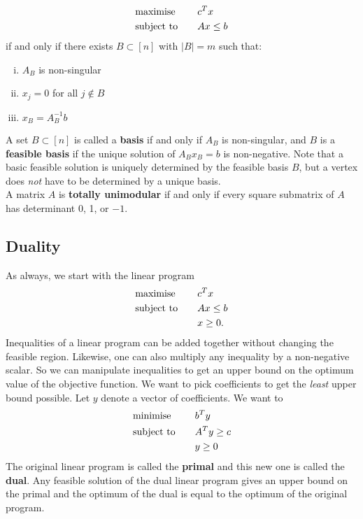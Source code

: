 \documentclass[12pt]{article}
\theoremstyle{plain}
\begin{document}
\begin{alignat*}{2}
    & \textup{maximise} & \quad & c^Tx \\
    & \textup{subject to} & & Ax \leq b
\end{alignat*}
if and only if there exists $B\subset [n]$ with $|B|= m$ such that:
\begin{enumerate}[i)]
    \item $A_B$ is non-singular
    \item $x_j = 0$ for all $j\notin B$
    \item $x_B = A_B^{-1}b$
\end{enumerate}
A set $B\subset [n]$ is called a \textbf{basis} if and only if $A_B$ is non-singular, and $B$ is a \textbf{feasible basis} if the unique solution of $A_Bx_B=b$ is non-negative. Note that a basic feasible solution is uniquely determined by the feasible basis $B$, but a vertex does \textit{not} have to be determined by a unique basis.\\
\indent A matrix $A$ is \textbf{totally unimodular} if and only if every square submatrix of $A$ has determinant 0, 1, or $-1$.

\subsection{Duality}
As always, we start with the linear program
\begin{alignat*}{2}
    & \textup{maximise} & \quad & c^Tx \\
    & \textup{subject to} & & Ax \leq b\\
    &                     & & x \geq 0.
\end{alignat*}
Inequalities of a linear program can be added together without changing the feasible region. Likewise, one can also multiply any inequality by a non-negative scalar. So we can manipulate inequalities to get an upper bound on the optimum value of the objective function. We want to pick coefficients to get the \textit{least} upper bound possible. Let $y$ denote a vector of coefficients. We want to
\begin{alignat*}{2}
    & \textup{minimise} & \quad & b^Ty \\
    & \textup{subject to} & & A^Ty \geq c\\
    &                     & & y \geq 0
\end{alignat*}
The original linear program is called the \textbf{primal} and this new one is called the \textbf{dual}. Any feasible solution of the dual linear program gives an upper bound on the primal and the optimum of the dual is equal to the optimum of the original program.
\end{document}
